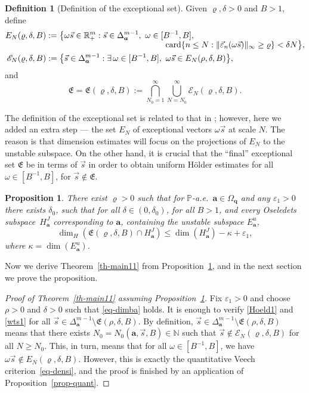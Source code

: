 \documentclass[10pt]{amsart}
\let\mathcal\mathscr
\newcommand{\sep}{:}
\let\epsilon\varepsilon
\theoremstyle{plain}
\newtheorem{prop}[theorem]{Proposition}
\theoremstyle{definition}
\newtheorem{defi}[theorem]{Definition}
\DeclareMathOperator{\card}{card}
\newcommand\bom{{\boldsymbol a}}\let\ba\bom
\newcommand\bq{{\boldsymbol q}}
\let\eps\varepsilon
\let\om\omega
\let\Om\Omega
\newcommand\Fre{\mathfrak{E}}
\newcommand{\Ek}{\mathcal{E}}
\newcommand{\R}{\mathbb{R}}
\newcommand{\N}{\mathbb{N}}
\renewcommand{\P}{\mathbb{P}}
\newcommand\be{\begin{equation}}
\newcommand\ee{\end{equation}}
\begin{document}
\begin{defi}[Definition of the exceptional set]
Given $\varrho,\delta>0$ and $B>1$, define
\begin{align*}
E_N(\varrho,\delta,B) &:=\bigl\{\om\vec{s}\in \R^m_+\sep \vec s\in \Delta_\bom^{m-1},\ \om\in [B^{-1},B],\\[-5pt]
&\hspace*{5cm}\card\{n\le N: \|\vec\eps_{n}(\om\vec s)\|_\infty\ge \varrho\} < \delta N\bigr\},\\
\Ek_N(\varrho,\delta,B)&:= \bigl\{\vec s\in \Delta_\bom^{m-1}\sep \exists\,\om\in [B^{-1},B],\ \om\vec s\in E_N(\rho,\delta,B)\bigr\},
\end{align*}
and
\be \label{def-excep}
\Fre=\Fre(\varrho,\delta,B):= \bigcap_{N_0=1}^\infty \bigcup_{N=N_0}^\infty \Ek_N(\varrho,\delta,B).
\ee
\end{defi}

The definition of the exceptional set is related to that in \cite[\S9]{BuSo18a}; however, here we added an extra step --- the set $E_N$ of exceptional vectors $\om\vec s$ at scale $N$. The reason is that dimension estimates will focus on the projections of $E_N$ to the unstable subspace. On the other hand, it is crucial that the ``final'' exceptional set $\Fre$ be in terms of $\vec s$ in order to obtain uniform Hölder estimates for all $\om\in [B^{-1},B]$, for $\vec s\not\in \Fre$.

\begin{prop} \label{prop-EK}
There exist $\varrho>0$ such that for $\P$-a.e.\ $\bom\in \Om_\bq$ and any $\epsilon_1>0$ there exists $\delta_0$, such that for all $\delta\in (0,\delta_0)$, for all $B>1$, and every
Oseledets subspace~$H_\bom^J$ corresponding to $\bom$, containing the unstable subspace $E^u_\bom$,
\be \label{eq-dimba}
\dim_H(\Fre(\varrho,\delta,B)\cap H_\bom^J) \le \dim(H_\bom^J) -\kappa + \epsilon_1,
\ee
where $\kappa=\dim(E^u_\bom)$.
\end{prop}

Now we derive Theorem~\ref{th-main11} from Proposition~\ref{prop-EK}, and in the next section we prove the proposition.

\begin{proof}[Proof of Theorem~\ref{th-main11} assuming Proposition~\ref{prop-EK}] Fix $\epsilon_1\!>\!0$ and choose $\rho\!>\!0$ and $\delta\!>\!0$ such that \eqref{eq-dimba} holds.
It is enough to verify \eqref{Hoeld1} and \eqref{wts1} for all $\vec s\in \Delta_\bom^{m-1}\setminus \Fre(\rho,\delta,B)$. By definition, $\vec{s} \in \Delta_{\bom}^{m-1}\setminus \Fre(\rho,\delta,B)$ means that there exists $N_0=N_0(\bom,\vec s, B)\in \N$ such that $\vec s\!\not\in\!\Ek_N(\varrho,\delta,B)$ for all $N\!\ge\!N_0$.
This, in turn, means that for all \hbox{$\om\in[B^{-1},B]$}, we have $\om\vec s\not \in E_N(\varrho,\delta,B)$. However, this is exactly the quantitative Veech criterion~\eqref{eq-densi}, and the proof is finished
by an application of Proposition~\ref{prop-quant}.
\end{proof}
\end{document}
